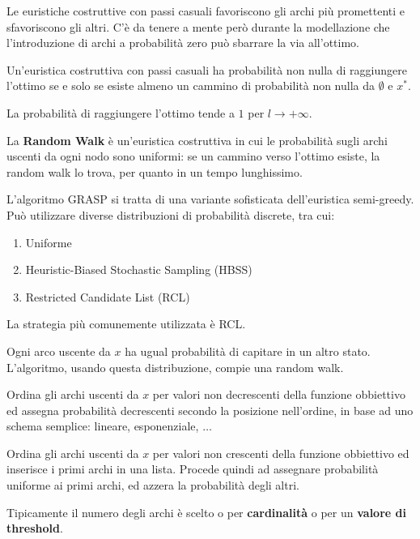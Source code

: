 \documentclass[\main/main.tex]{subfiles}
\begin{document}
\begin{multicols}{2}
\begin{observation}
    Le euristiche costruttive con passi casuali favoriscono gli archi più promettenti e sfavoriscono gli altri. C'è da tenere a mente però durante la modellazione che l'introduzione di archi a probabilità zero può sbarrare la via all'ottimo.
\end{observation}
\begin{property}
    Un'euristica costruttiva con passi casuali ha probabilità non nulla di raggiungere l'ottimo se e solo se esiste almeno un cammino di probabilità non nulla da \(\emptyset\) e \(x^*\).
    
     La probabilità di raggiungere l'ottimo tende a \(1\) per \(l \rightarrow + \infty\).
\end{property}
\begin{definition}
    La \textbf{Random Walk} è un'euristica costruttiva in cui le probabilità sugli archi uscenti da ogni nodo sono uniformi: se un cammino verso l'ottimo esiste, la random walk lo trova, per quanto in un tempo lunghissimo.
\end{definition}
\begin{definition}
    L'algoritmo GRASP si tratta di una variante sofisticata dell'euristica semi-greedy. Può utilizzare diverse distribuzioni di probabilità discrete, tra cui:
\begin{enumerate}
    \item Uniforme
    \item Heuristic-Biased Stochastic Sampling (HBSS)
    \item Restricted Candidate List (RCL)
\end{enumerate}
La strategia più comunemente utilizzata è RCL.
\end{definition}
    \begin{definition}
        Ogni arco uscente da \(x\) ha ugual probabilità di capitare in un altro stato. L'algoritmo, usando questa distribuzione, compie una random walk.
    \end{definition}
    \begin{definition}
        Ordina gli archi uscenti da \(x\) per valori non decrescenti della funzione obbiettivo ed assegna probabilità decrescenti secondo la posizione nell'ordine, in base ad uno schema semplice: lineare, esponenziale, \(\ldots\)
    \end{definition}
    \begin{definition}
        Ordina gli archi uscenti da \(x\) per valori non crescenti della funzione obbiettivo ed inserisce i primi archi in una lista. Procede quindi ad assegnare probabilità uniforme ai primi archi, ed azzera la probabilità degli altri.
        
        Tipicamente il numero degli archi è scelto o per \textbf{cardinalità} o per un \textbf{valore di threshold}.
    \end{definition}
\end{multicols}
\end{document}
